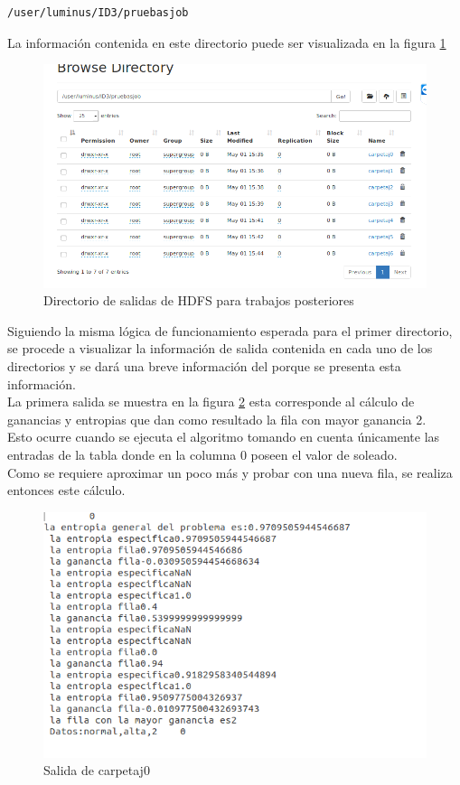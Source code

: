 \begin{verbatim}
/user/luminus/ID3/pruebasjob
\end{verbatim} 
La información contenida en este directorio puede ser visualizada en la figura \ref{fig:ID314}
\begin{figure}[H]
	\begin{center}
		\hypertarget{fig:ID313}{\hspace{1pt}}
		\includegraphics[width=.7\textwidth]{capitulo4a/images/ID3_19.png}
		\caption{Directorio de salidas de HDFS para trabajos posteriores}
		\label{fig:ID314}
	\end{center}
\end{figure}
Siguiendo la misma lógica de funcionamiento esperada para el primer directorio, se procede a visualizar la información de salida contenida en cada uno de los directorios y se dará una breve información del porque se presenta esta información. \\
La primera salida se muestra en la figura \ref{fig:ID315} esta corresponde al cálculo de ganancias y entropias que dan como resultado la fila con mayor ganancia 2. \\
Esto ocurre cuando se ejecuta el algoritmo tomando en cuenta únicamente las entradas de la tabla donde en la columna 0 poseen el valor de soleado.\\
Como se requiere aproximar un poco más y probar con una nueva fila, se realiza entonces este cálculo.
\begin{figure}[H]
	\begin{center}
		\hypertarget{fig:ID315}{\hspace{1pt}}
		\includegraphics[width=.7\textwidth]{capitulo4a/images/ID3_20.png}
		\caption{Salida de carpetaj0}
		\label{fig:ID315}
	\end{center}
\end{figure}
